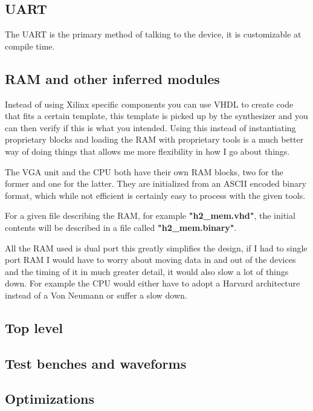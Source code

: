 \documentclass	[a4paper, 10pt]	{article}
\begin{document}
    \subsection{UART}

      The UART is the primary method of talking to the device, it is customizable at
      compile time.

    \subsection{RAM and other inferred modules}

      Instead of using Xilinx specific components you can use VHDL to create code that
      fits a certain template, this template is picked up by the synthesizer and you  
      can then verify if this is what you intended. Using this instead of instantiating
      proprietary blocks and loading the RAM with proprietary tools is a much better
      way of doing things that allows me more flexibility in how I go about things.

      The VGA unit and the CPU both have their own RAM blocks, two for the former and
      one for the latter. They are initialized from an ASCII encoded binary format,
      which while not efficient is certainly easy to process with the given tools.

      For a given file describing the RAM, for example \textbf{"h2\_mem.vhd"}, 
      the initial contents will be described in a file called \textbf{"h2\_mem.binary"}.

      All the RAM used is dual port this greatly simplifies the design, if I had to single
      port RAM I would have to worry about moving data in and out of the devices and the
      timing of it in much greater detail, it would also slow a lot of things down. For example
      the CPU would either have to adopt a Harvard architecture instead of a Von Neumann 
      or suffer a slow down.

    \subsection{Top level}
    \subsection{Test benches and waveforms}
    \subsection{Optimizations}
\end{document}
